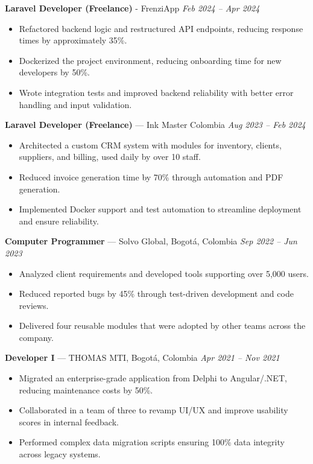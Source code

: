 \documentclass[10.5pt,letterpaper]{article}
\begin{document}
	\textbf{Laravel Developer (Freelance)} - FrenziApp
	\hfill
	\textit{Feb 2024 – Apr 2024}
	\begin{itemize}
		\item Refactored backend logic and restructured API endpoints, reducing response times by approximately 35\%.
		\item Dockerized the project environment, reducing onboarding time for new developers by 50\%.
		\item Wrote integration tests and improved backend reliability with better error handling and input validation.
	\end{itemize}
	
	\textbf{Laravel Developer (Freelance)} — Ink Master Colombia
	\hfill
	\textit{Aug 2023 – Feb 2024}
	\begin{itemize}
		\item Architected a custom CRM system with modules for inventory, clients, suppliers, and billing, used daily by over 10 staff.
		\item Reduced invoice generation time by 70\% through automation and PDF generation.
		\item Implemented Docker support and test automation to streamline deployment and ensure reliability.
	\end{itemize}
	
	\textbf{Computer Programmer} — Solvo Global, Bogotá, Colombia
	\hfill
	\textit{Sep 2022 – Jun 2023}
	\begin{itemize}
		\item Analyzed client requirements and developed tools supporting over 5,000 users.
		\item Reduced reported bugs by 45\% through test-driven development and code reviews.
		\item Delivered four reusable modules that were adopted by other teams across the company.
	\end{itemize}
	
	\textbf{Developer I} — THOMAS MTI, Bogotá, Colombia
	\hfill
	\textit{Apr 2021 – Nov 2021}
	\begin{itemize}
		\item Migrated an enterprise-grade application from Delphi to Angular/.NET, reducing maintenance costs by 50\%.
		\item Collaborated in a team of three to revamp UI/UX and improve usability scores in internal feedback.
		\item Performed complex data migration scripts ensuring 100\% data integrity across legacy systems.
	\end{itemize}
	
\end{document}
